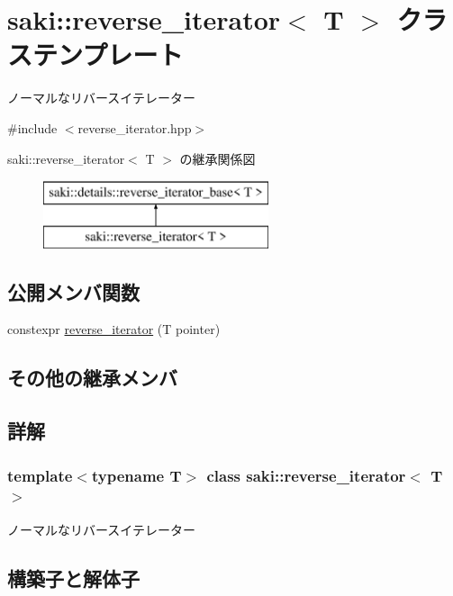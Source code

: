 \hypertarget{classsaki_1_1reverse__iterator}{}\section{saki\+:\+:reverse\+\_\+iterator$<$ T $>$ クラステンプレート}
\label{classsaki_1_1reverse__iterator}


ノーマルなリバースイテレーター  




{\ttfamily \#include $<$reverse\+\_\+iterator.\+hpp$>$}

saki\+:\+:reverse\+\_\+iterator$<$ T $>$ の継承関係図\begin{figure}[H]
\begin{center}
\leavevmode
\includegraphics[height=2.000000cm]{classsaki_1_1reverse__iterator}
\end{center}
\end{figure}
\subsection*{公開メンバ関数}
\begin{DoxyCompactItemize}
\item 
constexpr \mbox{\hyperlink{classsaki_1_1reverse__iterator_aed4bbf5a55d71b1f95e2a24d5dc88158}{reverse\+\_\+iterator}} (T pointer)
\end{DoxyCompactItemize}
\subsection*{その他の継承メンバ}


\subsection{詳解}
\subsubsection*{template$<$typename T$>$\newline
class saki\+::reverse\+\_\+iterator$<$ T $>$}

ノーマルなリバースイテレーター 

\subsection{構築子と解体子}
\mbox{\label{classsaki_1_1reverse__iterator_aed4bbf5a55d71b1f95e2a24d5dc88158}} 
